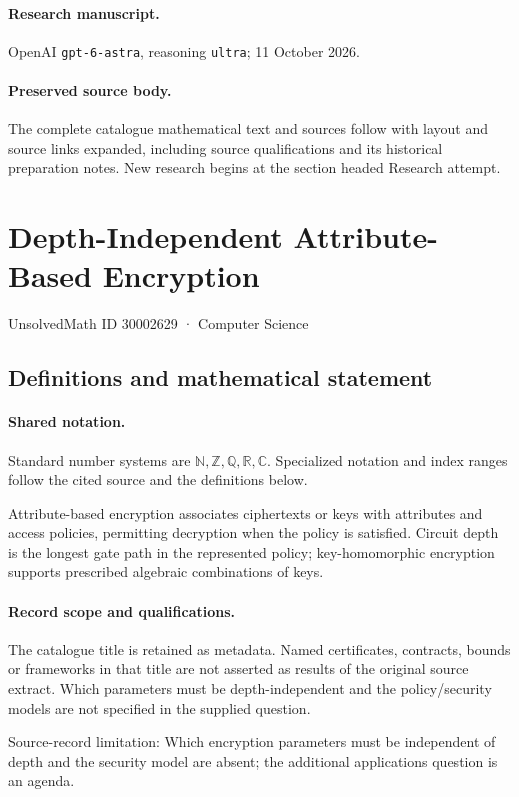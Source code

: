 \documentclass[11pt]{article}
\begin{document}
\paragraph{Research manuscript.} OpenAI \texttt{gpt-6-astra}, reasoning \texttt{ultra}; 11 October 2026.
\paragraph{Preserved source body.} The complete catalogue mathematical text and sources follow with layout and source links expanded, including source qualifications and its historical preparation notes. New research begins at the section headed Research attempt.

\section{Depth-Independent Attribute-Based Encryption}\label{30002629}
{\small UnsolvedMath ID 30002629 · Computer Science}
\subsection{Definitions and mathematical statement}

\paragraph{Shared notation.}Standard number systems are $\mathbb N,\mathbb Z,\mathbb Q,\mathbb R,\mathbb C$. Specialized notation and index ranges follow the cited source and the definitions below.


Attribute-based encryption associates ciphertexts or keys with attributes and access policies, permitting decryption when the policy is satisfied. Circuit depth is the longest gate path in the represented policy; key-homomorphic encryption supports prescribed algebraic combinations of keys.
\paragraph{Record scope and qualifications.}
The catalogue title is retained as metadata. Named certificates, contracts, bounds or frameworks in that title are not asserted as results of the original source extract.
Which parameters must be depth-independent and the policy/security models are not specified in the supplied question.

Source-record limitation: Which encryption parameters must be independent of depth and the security model are absent; the additional applications question is an agenda.
\end{document}

